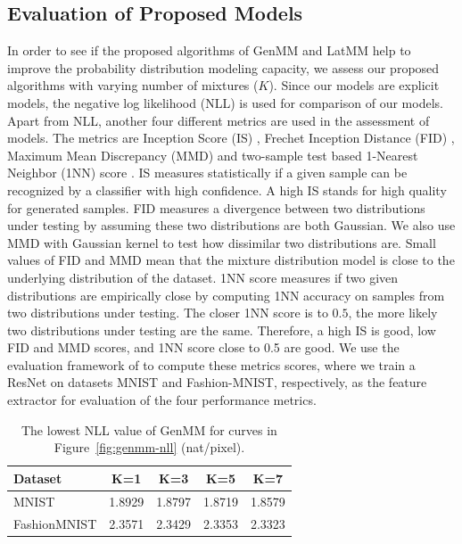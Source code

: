 \subsection{Evaluation of Proposed Models}\label{chpt6:sec:eval-metrics}
In order to see if the proposed algorithms of GenMM and LatMM help to improve the probability distribution modeling capacity, we assess our proposed algorithms with varying number of mixtures ($K$). Since our models are explicit models, the negative log likelihood (NLL) is used for comparison of our models. Apart from NLL, another four different metrics are used in the assessment of models.
The metrics are Inception Score (IS) \cite{NIPS2016_6125,2018arXiv180101973B,2018arXiv180607755X}, Frechet
Inception Distance (FID) \cite{2017arXiv170608500H}, Maximum Mean
Discrepancy (MMD) \cite{2018arXiv180607755X} and two-sample test based 1-Nearest
Neighbor (1NN) score \cite{2016arXiv161006545L}. IS measures statistically if a given sample can be recognized by a classifier with high confidence. A high IS stands for high quality for generated samples. FID measures a divergence between two distributions under testing by assuming these two distributions are both Gaussian. We also use MMD with Gaussian kernel to test how dissimilar two distributions are.
Small values of FID and MMD mean that the mixture distribution model
is close to the underlying distribution of the dataset. 1NN score measures
if two given distributions are empirically close by computing 1NN accuracy
on samples from two distributions under testing. The closer 1NN score is to $0.5$, the more likely 
two distributions under testing are the same. Therefore, a high IS is good, low FID and MMD scores, and 1NN score close to 0.5 are good. We use the evaluation
framework of \cite{2018arXiv180607755X} to compute these metrics scores, where
we train a ResNet on datasets MNIST and Fashion-MNIST, respectively, as the feature extractor for evaluation of the four performance metrics.



\begin{table}
  \caption{The lowest NLL value of GenMM for curves in Figure~\ref{fig:genmm-nll} (nat/pixel).}
  \label{tab:lowestNLLgenMM}
   \centering
  \begin{tabular}{lcccc}
    \toprule
    {Dataset} & K=1 &  K=3 &  K=5 &  K=7 \\                                         
    \midrule                                                                                          MNIST &     1.8929 &    1.8797 &    1.8719 &    1.8579 \\
    FashionMNIST &   2.3571 &   2.3429 &   2.3353 &   2.3323 \\
    \bottomrule
  \end{tabular} 
\end{table}

